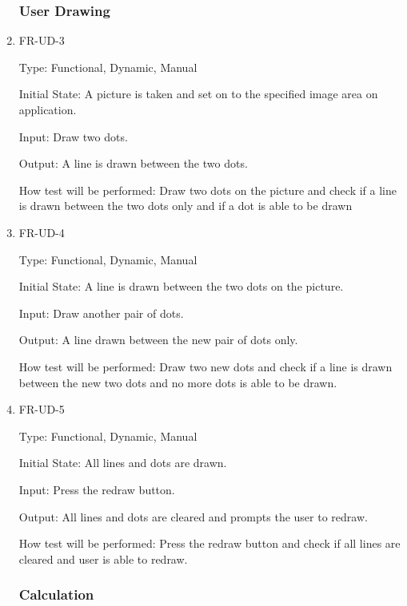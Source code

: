 \documentclass[12pt, titlepage]{article}
\begin{document}
\begin{enumerate}
\subsubsection{User Drawing}	
					\item{FR-UD-3\\}
					
					Type: Functional, Dynamic, Manual
					
					Initial State: A picture is taken and set on to the specified image area on application.
					
					Input: Draw two dots. 
					
					Output: A line is drawn between the two dots.
					
					How test will be performed: Draw two dots on the picture and check if a line is drawn between the two dots only and if a dot is able to be drawn
					
					
					\item{FR-UD-4\\}
					
					Type: Functional, Dynamic, Manual
					
					Initial State: A line is drawn between the two dots on the picture.
					
					Input: Draw another pair of dots. 
					
					Output: A line drawn between the new pair of dots only.
					
					How test will be performed: Draw two new dots and check if a line is drawn between the new two dots and no more dots is able to be drawn. 
					
					\item{FR-UD-5\\}
					
					Type: Functional, Dynamic, Manual
					
					Initial State: All lines and dots are drawn.
					
					Input: Press the redraw button.
					
					Output: All lines and dots are cleared and prompts the user to redraw.
					
					How test will be performed: Press the redraw button and check if all lines are cleared and user is able to redraw.
					
					
\subsubsection{Calculation}



\end{enumerate}
\end{document}
